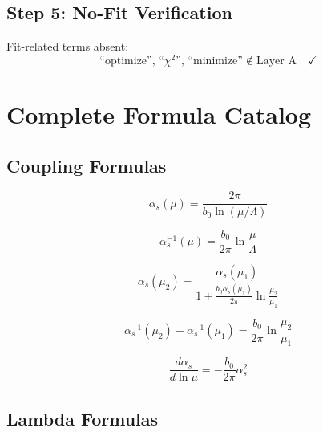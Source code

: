 \documentclass[11pt,a4paper]{article}
\theoremstyle{definition}
\begin{document}
\subsection{Step 5: No-Fit Verification}
\label{subsec:verify-nofit}

Fit-related terms absent:
\begin{equation}
\label{eq:app-verify-nofit}
\text{``optimize'', ``$\chi^2$'', ``minimize''} \notin \text{Layer A} \quad \checkmark
\end{equation}

\section{Complete Formula Catalog}
\label{app:catalog}

\subsection{Coupling Formulas}
\label{subsec:cat-coupling}

\begin{equation}
\label{eq:cat-1}
\alpha_s(\mu) = \frac{2\pi}{b_0\ln(\mu/\Lambda)}
\end{equation}

\begin{equation}
\label{eq:cat-2}
\alpha_s^{-1}(\mu) = \frac{b_0}{2\pi}\ln\frac{\mu}{\Lambda}
\end{equation}

\begin{equation}
\label{eq:cat-3}
\alpha_s(\mu_2) = \frac{\alpha_s(\mu_1)}{1 + \frac{b_0\alpha_s(\mu_1)}{2\pi}\ln\frac{\mu_2}{\mu_1}}
\end{equation}

\begin{equation}
\label{eq:cat-4}
\alpha_s^{-1}(\mu_2) - \alpha_s^{-1}(\mu_1) = \frac{b_0}{2\pi}\ln\frac{\mu_2}{\mu_1}
\end{equation}

\begin{equation}
\label{eq:cat-5}
\frac{d\alpha_s}{d\ln\mu} = -\frac{b_0}{2\pi}\alpha_s^2
\end{equation}

\subsection{Lambda Formulas}
\label{subsec:cat-lambda}
\end{document}
